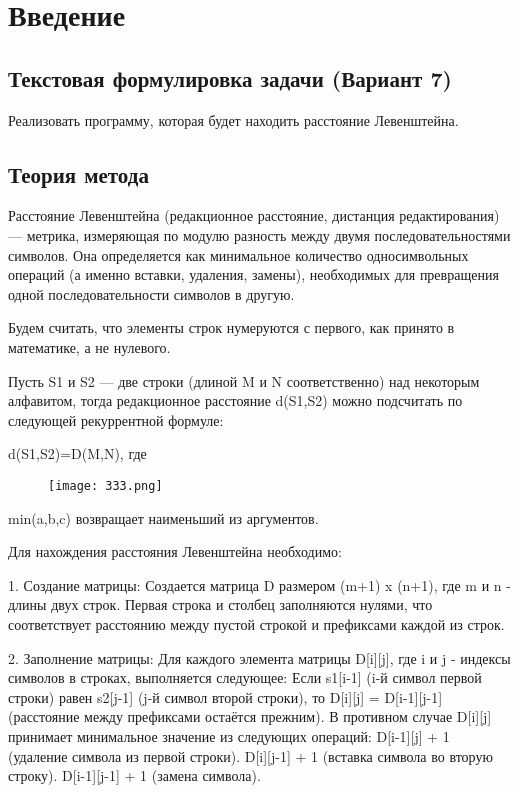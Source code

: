 \documentclass[12pt,a4paper]{scrartcl}
\begin{document}
\section{Введение}
\label{sec:intro}

\subsection{Текстовая формулировка задачи (Вариант 7)}
Реализовать программу, которая будет находить расстояние Левенштейна.

\subsection{Теория метода}

Расстояние Левенштейна (редакционное расстояние, дистанция редактирования) — метрика, измеряющая по модулю разность между двумя последовательностями символов. Она определяется как минимальное количество односимвольных операций (а именно вставки, удаления, замены), необходимых для превращения одной последовательности символов в другую.  

Будем считать, что элементы строк нумеруются с первого, как принято в математике, а не нулевого. 

Пусть S1 и S2 — две строки (длиной M и N соответственно) над некоторым алфавитом, тогда редакционное расстояние d(S1,S2) можно подсчитать по следующей рекуррентной формуле: 

 d(S1,S2)=D(M,N), где 
 \begin{figure}[H]
    \centering
    \texttt{[image: 333.png]}
    \label{fig:desktop-view}
\end{figure}
min(a,b,c) возвращает наименьший из аргументов.

Для нахождения расстояния Левенштейна необходимо:

1. Создание матрицы:
Создается матрица D размером (m+1) x (n+1), где m и n - длины двух строк. Первая строка и столбец заполняются нулями, что соответствует расстоянию между пустой строкой и префиксами каждой из строк.

2. Заполнение матрицы:
Для каждого элемента матрицы D[i][j], где i и j - индексы символов в строках, выполняется следующее:
Если s1[i-1] (i-й символ первой строки) равен s2[j-1] (j-й символ второй строки), то D[i][j] = D[i-1][j-1] (расстояние между префиксами остаётся прежним).
В противном случае D[i][j] принимает минимальное значение из следующих операций:
D[i-1][j] + 1 (удаление символа из первой строки).
D[i][j-1] + 1 (вставка символа во вторую строку).
D[i-1][j-1] + 1 (замена символа).
\end{document}
